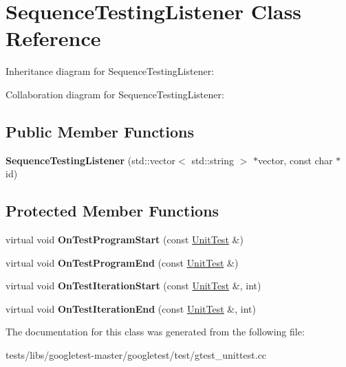 \hypertarget{classSequenceTestingListener}{}\section{Sequence\+Testing\+Listener Class Reference}
\label{classSequenceTestingListener}


Inheritance diagram for Sequence\+Testing\+Listener\+:


Collaboration diagram for Sequence\+Testing\+Listener\+:
\subsection*{Public Member Functions}
\begin{DoxyCompactItemize}
\item 
\mbox{\label{classSequenceTestingListener_ac0fcb350d20876f8273621ad4c79ba7a}} 
{\bfseries Sequence\+Testing\+Listener} (std\+::vector$<$ std\+::string $>$ $\ast$vector, const char $\ast$id)
\end{DoxyCompactItemize}
\subsection*{Protected Member Functions}
\begin{DoxyCompactItemize}
\item 
\mbox{\label{classSequenceTestingListener_a25b96acdbaa6f582e583e6b56bd39b42}} 
virtual void {\bfseries On\+Test\+Program\+Start} (const \hyperlink{classtesting_1_1UnitTest}{Unit\+Test} \&)
\item 
\mbox{\label{classSequenceTestingListener_aacac5e15bac089460841ff63a5c31f57}} 
virtual void {\bfseries On\+Test\+Program\+End} (const \hyperlink{classtesting_1_1UnitTest}{Unit\+Test} \&)
\item 
\mbox{\label{classSequenceTestingListener_a345641262fa10cc4b251ac54116db74b}} 
virtual void {\bfseries On\+Test\+Iteration\+Start} (const \hyperlink{classtesting_1_1UnitTest}{Unit\+Test} \&, int)
\item 
\mbox{\label{classSequenceTestingListener_a783bc01e2a95f5bf73bbde4d96832e0f}} 
virtual void {\bfseries On\+Test\+Iteration\+End} (const \hyperlink{classtesting_1_1UnitTest}{Unit\+Test} \&, int)
\end{DoxyCompactItemize}


The documentation for this class was generated from the following file\+:\begin{DoxyCompactItemize}
\item 
tests/libs/googletest-\/master/googletest/test/gtest\+\_\+unittest.\+cc\end{DoxyCompactItemize}
